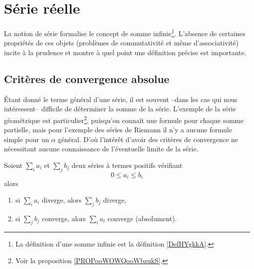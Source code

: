 \section{Série réelle}
\label{secseries}

La notion de série formalise le concept de somme infinie\footnote{La définition d'une somme infinie est la définition \ref{DefHYgkkA}.}. L'absence de certaines propriétés de ces objets (problèmes de commutativité et même d'associativité) incite à la prudence et montre à quel point une définition précise est importante.


\subsection{Critères de convergence absolue}

Étant donné le terme général d'une série, il est souvent --dans les cas qui nous intéressent-- difficile de déterminer la somme de la série. L'exemple de la série géométrique est particulier\footnote{Voir la proposition \ref{PROPooWOWQooWbzukS}.}, puisqu'on connaît une formule pour chaque somme partielle, mais pour l'exemple des séries de Riemann il n'y a aucune formule simple pour un $\alpha$ général. D'où l'intérêt d'avoir des critères de convergence ne nécessitant aucune connaissance de l'éventuelle limite de la série.

\begin{lemma}   \label{LemgHWyfG}
Soient $\sum_i a_i$ et $\sum_j
b_j$ deux séries à termes positifs vérifiant
\begin{equation*}
  0 \leq a_i \leq b_i
\end{equation*}
alors
\begin{enumerate}
\item si $\sum_i a_i$ diverge, alors $\sum_j b_j$ diverge,
\item si $\sum_j b_j$ converge, alors $\sum_i a_i$ converge
  (absolument).
  \end{enumerate}
\end{lemma}

